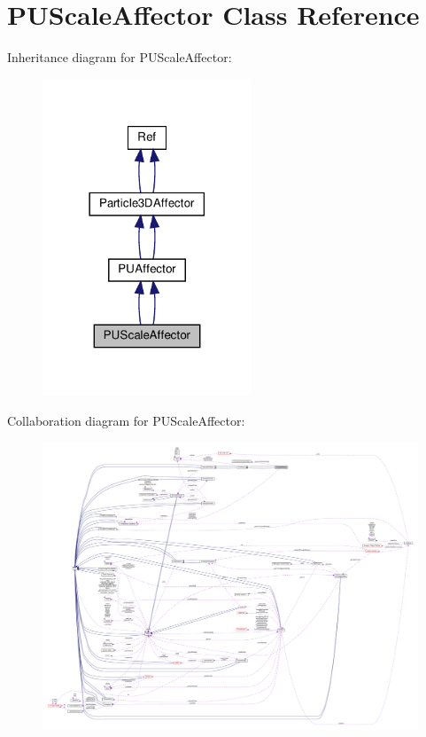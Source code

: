 \hypertarget{classPUScaleAffector}{}\section{P\+U\+Scale\+Affector Class Reference}
\label{classPUScaleAffector}


Inheritance diagram for P\+U\+Scale\+Affector\+:
\nopagebreak
\begin{figure}[H]
\begin{center}
\leavevmode
\includegraphics[width=177pt]{classPUScaleAffector__inherit__graph}
\end{center}
\end{figure}


Collaboration diagram for P\+U\+Scale\+Affector\+:
\nopagebreak
\begin{figure}[H]
\begin{center}
\leavevmode
\includegraphics[width=350pt]{classPUScaleAffector__coll__graph}
\end{center}
\end{figure}
